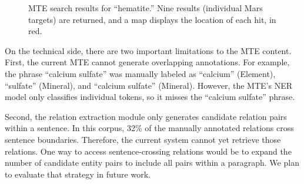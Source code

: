 \documentclass[letterpaper]{article} %
\begin{document}
\begin{figure}
\begin{center}
\end{center}
\caption{MTE search results for ``hematite.''  Nine results
(individual Mars targets) are returned, and a map displays the
location of each hit, in red.}
\label{fig:mtesearch}
\end{figure}

On the technical side, there are two important limitations to the MTE
content.  First, the current MTE cannot generate overlapping
annotations.  For example, the phrase ``calcium sulfate'' was manually
labeled as ``calcium'' (Element), ``sulfate'' (Mineral), and
``calcium sulfate'' (Mineral).  However, the MTE's NER model only
classifies individual tokens, so it misses the ``calcium sulfate''
phrase. 

Second, the relation extraction module only generates candidate
relation pairs within a sentence.  In this corpus, 32\% of the
manually annotated relations cross sentence boundaries.  Therefore,
the current system cannot yet retrieve those relations.  
%
One way to access sentence-crossing relations would be to expand the
number of candidate entity pairs to include all pairs within a
paragraph.  We plan to evaluate that strategy in future work.
\end{document}
